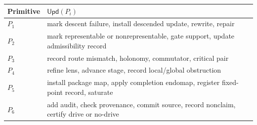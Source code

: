 \documentclass[11pt]{article}
\theoremstyle{definition}
\begin{document}
\begin{longtable}[]{@{}ll@{}}
\toprule
\begin{minipage}[b]{0.47\columnwidth}\raggedright
Primitive\strut
\end{minipage} & \begin{minipage}[b]{0.47\columnwidth}\raggedright
\(\mathsf{Upd}(P_i)\)\strut
\end{minipage}\tabularnewline
\midrule
\endhead
\begin{minipage}[t]{0.47\columnwidth}\raggedright
\(P_1\)\strut
\end{minipage} & \begin{minipage}[t]{0.47\columnwidth}\raggedright
mark descent failure, install descended update, rewrite, repair\strut
\end{minipage}\tabularnewline
\begin{minipage}[t]{0.47\columnwidth}\raggedright
\(P_2\)\strut
\end{minipage} & \begin{minipage}[t]{0.47\columnwidth}\raggedright
mark representable or nonrepresentable, gate support, update admissibility record\strut
\end{minipage}\tabularnewline
\begin{minipage}[t]{0.47\columnwidth}\raggedright
\(P_3\)\strut
\end{minipage} & \begin{minipage}[t]{0.47\columnwidth}\raggedright
record route mismatch, holonomy, commutator, critical pair\strut
\end{minipage}\tabularnewline
\begin{minipage}[t]{0.47\columnwidth}\raggedright
\(P_4\)\strut
\end{minipage} & \begin{minipage}[t]{0.47\columnwidth}\raggedright
refine lens, advance stage, record local/global obstruction\strut
\end{minipage}\tabularnewline
\begin{minipage}[t]{0.47\columnwidth}\raggedright
\(P_5\)\strut
\end{minipage} & \begin{minipage}[t]{0.47\columnwidth}\raggedright
install package map, apply completion endomap, register fixed-point record, saturate\strut
\end{minipage}\tabularnewline
\begin{minipage}[t]{0.47\columnwidth}\raggedright
\(P_6\)\strut
\end{minipage} & \begin{minipage}[t]{0.47\columnwidth}\raggedright
add audit, check provenance, commit source, record nonclaim, certify drive or no-drive\strut
\end{minipage}\tabularnewline
\bottomrule
\end{longtable}
\end{document}
